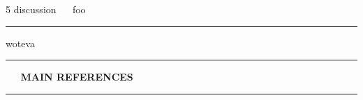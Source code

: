 \documentclass[11pt, compress, t, notes = noshow, xcolor = table, 
aspectratio = 1610]{beamer}
\newcommand{\highlight}[1]{\textcolor{highlightcol}{\textbf{#1}}}
\begin{document}

\LARGE
\begin{frame}{\textcolor{gray!90}{5 discussion} ~~ foo}
\normalsize
\vspace{-0.5cm}
\noindent \textcolor{gray!90}{\rule{\textwidth}{1pt}}


\medskip

woteva

\end{frame}


\LARGE
\begin{frame}{\phantom{foo}}
\normalsize
\vspace{-0.5cm}
\noindent \textcolor{gray!90}{\rule{\textwidth}{1pt}}
\smallskip

\Huge
\hspace{0pt}
\vfill
\textbf{\highlight{~~ MAIN REFERENCES}}
\vfill
\hspace{0pt}

\noindent \textcolor{gray!90}{\rule{\textwidth}{1pt}}

\end{frame}


\begin{frame}{}
\footnotesize




\end{frame}


\endlecture
\end{document}

